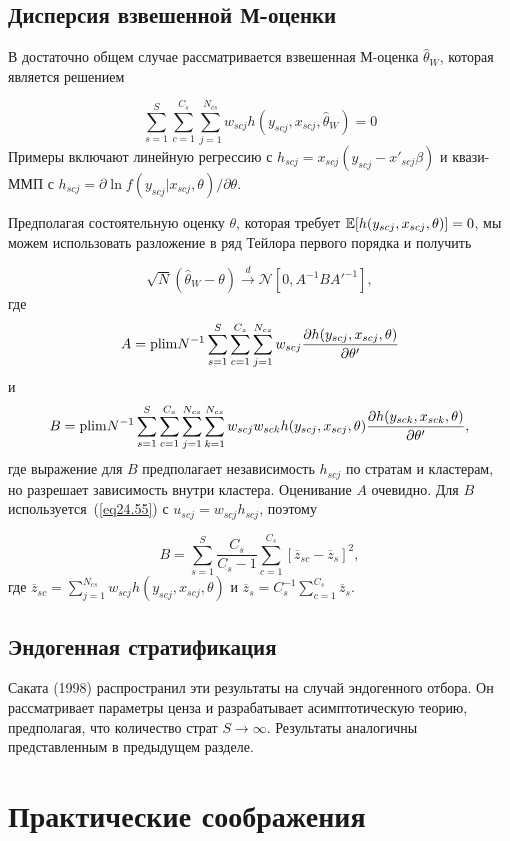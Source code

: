 \subsection*{Дисперсия взвешенной М-оценки}

В достаточно общем случае рассматривается взвешенная М-оценка $\hat \theta_W$, которая является решением

$$
\sum_{s=1}^S \sum_{c=1}^{C_s} \sum_{j=1}^{N_{cs}} w_{scj} h( y_{scj}, x_{scj}, \hat \theta_W) = 0
$$
Примеры включают линейную регрессию с $h_{scj} = x_{scj} (y_{scj} - x'_{scj} \beta)$ и квази-ММП с $h_{scj} = \partial \ln f (y_{scj} | x_{scj}, \theta) / \partial \theta$. 

Предполагая состоятельную оценку $\theta$, которая требует $\mathbb{E}[h(y_{scj}, x_{scj}, \theta)] = 0$, мы можем использовать разложение в ряд Тейлора первого порядка и получить

$$
\sqrt{N} (\hat \theta_W - \theta) \overset{d}{\to} \mathcal N \left[  0, A^{-1} B A'^{-1} \right],
$$
где
$$
A = \mathrm{plim } N^{-1} \sum_{s=1}^S \sum_{c=1}^{C_s} \sum_{j=1}^{N_{cs}} w_{scj} \frac{\partial h(y_{scj}, x_{scj}, \theta)}{\partial \theta'}
$$
и
$$
B = \mathrm{plim } N^{-1} \sum_{s=1}^S \sum_{c=1}^{C_s} \sum_{j=1}^{N_{cs}} \sum_{k=1}^{N_{cs}} w_{scj} w_{sck} h(y_{scj}, x_{scj}, \theta)  \frac{\partial h(y_{sck}, x_{sck}, \theta)}{\partial \theta'},
$$
где выражение для $B$ предполагает независимость $h_{scj}$ по стратам и кластерам, но разрешает зависимость внутри кластера. Оценивание $A$ очевидно. Для $B$ используется~(\ref{eq24.55}) с $u_{scj} = w_{scj} h_{scj}$, поэтому

$$
B = \sum_{s=1}^S \frac{C_s}{C_s - 1} \sum_{c=1}^{C_s} [\overline{z}_{sc} - \overline{z}_s]^2, 
$$
где $ \overline{z}_{sc} = \sum_{j=1}^{N_{cs}} w_{scj} h (y_{scj}, x_{scj}, \theta)$ и $\overline{z}_{s} = C_s^{-1} \sum_{c=1}^{C_s} \overline{z}_{s}$. 

\subsection*{Эндогенная стратификация}

Саката (1998) распространил эти результаты на случай эндогенного отбора. Он рассматривает параметры ценза и разрабатывает асимптотическую теорию, предполагая, что количество страт $S \to \infty$. Результаты аналогичны представленным в предыдущем разделе. 

\section{Практические соображения}

